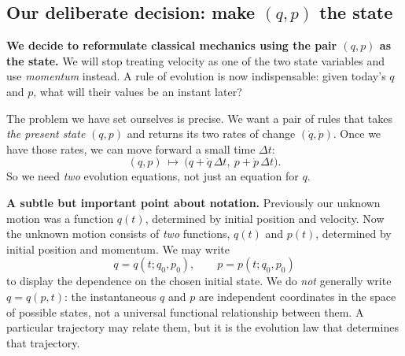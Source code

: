 \documentclass[11pt,a4paper,oneside]{article}
\begin{document}
\subsection{Our deliberate decision: make $(q,p)$ the state}
\begin{intuition}[title={\strut The decision that defines our new viewpoint}]
\textbf{We decide to reformulate classical mechanics using the pair $(q,p)$ as the state.} We will stop treating velocity as one of the two state variables and use \emph{momentum} instead. A rule of evolution is now indispensable: given today's $q$ and $p$, what will their values be an instant later?
\end{intuition}
The problem we have set ourselves is precise. We want a pair of rules that takes \emph{the present state} $(q,p)$ and returns its two rates of change $(\dot q,\dot p)$. Once we have those rates, we can move forward a small time $\Delta t$:
\[
(q,p)\ \longmapsto\
\bigl(q+\dot q\,\Delta t,\ p+\dot p\,\Delta t\bigr).
\]
So we need \emph{two} evolution equations, not just an equation for $q$.

\textbf{A subtle but important point about notation.} Previously our unknown motion was a function $q(t)$, determined by initial position and velocity. Now the unknown motion consists of \emph{two} functions, $q(t)$ and $p(t)$, determined by initial position and momentum. We may write
\[
 q=q(t;q_0,p_0),\qquad p=p(t;q_0,p_0)
\]
to display the dependence on the chosen initial state. We do \emph{not} generally write $q=q(p,t)$: the instantaneous $q$ and $p$ are independent coordinates in the space of possible states, not a universal functional relationship between them. A particular trajectory may relate them, but it is the evolution law that determines that trajectory.
\end{document}

